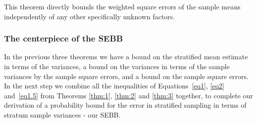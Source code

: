 This theorem directly bounds the weighted square errors of the sample means independently of any other specifically unknown factors.

\subsubsection{The centerpiece of the SEBB}\label{subsubsection:centerpiece}

In the previous three theorems we have a bound on the stratified mean estimate in terms of the variances, a bound on the variances in terms of the sample variances by the sample square errors, and a bound on the sample square errors.
In the next step we combine all the inequalities of Equations~\eqref{eq1}, \eqref{eq2} and~\eqref{eq1.5} from Theorems \ref{thm:1}, \ref{thm:2} and \ref{thm:3} together, to complete our derivation of a probability bound for the error in stratified sampling in terms of stratum sample variances - our SEBB.


